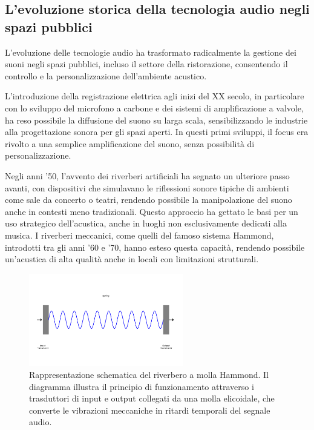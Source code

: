 \subsection{L'evoluzione storica della tecnologia audio negli spazi pubblici}
\noindent

L’evoluzione delle tecnologie audio ha trasformato radicalmente la gestione dei suoni negli spazi pubblici, incluso il settore della ristorazione, consentendo il controllo e la personalizzazione dell’ambiente acustico.

L’introduzione della registrazione elettrica agli inizi del XX secolo, in particolare con lo sviluppo del microfono a carbone e dei sistemi di amplificazione a valvole, ha reso possibile la diffusione del suono su larga scala, sensibilizzando le industrie alla progettazione sonora per gli spazi aperti. In questi primi sviluppi, il focus era rivolto a una semplice amplificazione del suono, senza possibilità di personalizzazione.

Negli anni ’50, l’avvento dei riverberi artificiali ha segnato un ulteriore passo avanti, con dispositivi che simulavano le riflessioni sonore tipiche di ambienti come sale da concerto o teatri, rendendo possibile la manipolazione del suono anche in contesti meno tradizionali. Questo approccio ha gettato le basi per un uso strategico dell’acustica, anche in luoghi non esclusivamente dedicati alla musica. I riverberi meccanici, come quelli del famoso sistema Hammond, introdotti tra gli anni ’60 e ’70, hanno esteso questa capacità, rendendo possibile un’acustica di alta qualità anche in locali con limitazioni strutturali. \cite{liquidsonics_reverb, wired1997}

\begin{figure}[H]
    \centering
    \includegraphics[width=0.6\textwidth]{Chapters/Figures/hammond_reverb.png}
    \caption{\small Rappresentazione schematica del riverbero a molla Hammond. Il diagramma illustra il principio di funzionamento attraverso i trasduttori di input e output collegati da una molla elicoidale, che converte le vibrazioni meccaniche in ritardi temporali del segnale audio.}
    \label{fig:hammond_reverb}
\end{figure}

